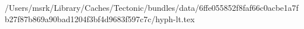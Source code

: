 /Users/msrk/Library/Caches/Tectonic/bundles/data/6ffe055852f8faf66c0acbe1a7fb27f87b869a90bad1204f3bf4d9683f597c7c/hyph-lt.tex